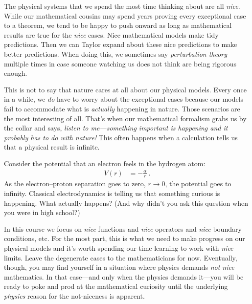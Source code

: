 The physical systems that we spend the most time thinking about are all \emph{nice}. 
%
While our mathematical cousins may spend years proving every exceptional case to a theorem, we tend to be happy to push onward as long as mathematical results are true for the \emph{nice} cases. 
%
Nice mathematical models make tidy predictions. Then we can Taylor expand about these nice predictions to make better predictions.
%
When doing this, we sometimes say \emph{perturbation theory} multiple times in case someone watching us does not think are being rigorous enough.
% 
%

This is not to say that nature cares at all about our physical models. 
%
Every once in a while, we \emph{do} have to worry about the exceptional cases because our models fail to accommodate what is \emph{actually} happening in nature. Those scenarios are the most interesting of all. That’s when our mathematical formalism grabs us by the collar and says, \emph{listen to me---something important is happening and it probably has to do with nature!} This often happens when a calculation tells us that a physical result is infinite. 

\begin{exercise}\label{ex:hydrogen:problem}
Consider the potential that an electron feels in the hydrogen atom:
\begin{align}
	V(r) &= -\frac{\alpha}{r} \ .
\end{align}
As the electron--proton separation goes to zero, $r\to 0$, the potential goes to infinity. Classical electrodynamics is telling us that something curious is happening. What actually happens? (And why didn't you ask this question when you were in high school?)
\end{exercise}

In this course we focus on \emph{nice} functions and \emph{nice} operators and \emph{nice} boundary conditions, etc. For the most part, this is what we need to make progress on our physical models and it’s worth spending our time learning to work with \emph{nice} limits. Leave the degenerate cases to the mathematicians for now. Eventually, though, you may find yourself in a situation where physics demands \emph{not nice} mathematics. In that case---and only when the physics demands it---you will be ready to poke and prod at the mathematical curiosity until the underlying \emph{physics} reason for the not-niceness is apparent.

